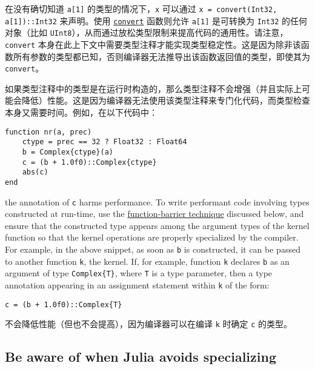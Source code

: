 在没有确切知道 \texttt{a[1]} 的类型的情况下，\texttt{x} 可以通过 \texttt{x = convert(Int32, a[1])::Int32} 来声明。使用 \hyperlink{1846942650946171605}{\texttt{convert}} 函数则允许 \texttt{a[1]} 是可转换为 \texttt{Int32} 的任何对象（比如 \texttt{UInt8}），从而通过放松类型限制来提高代码的通用性。请注意，\texttt{convert} 本身在此上下文中需要类型注释才能实现类型稳定性。这是因为除非该函数所有参数的类型都已知，否则编译器无法推导出该函数返回值的类型，即使其为 \texttt{convert}。



如果类型注释中的类型是在运行时构造的，那么类型注释不会增强（并且实际上可能会降低）性能。这是因为编译器无法使用该类型注释来专门化代码，而类型检查本身又需要时间。例如，在以下代码中：




\begin{verbatim}
function nr(a, prec)
    ctype = prec == 32 ? Float32 : Float64
    b = Complex{ctype}(a)
    c = (b + 1.0f0)::Complex{ctype}
    abs(c)
end
\end{verbatim}



the annotation of \texttt{c} harms performance. To write performant code involving types constructed at run-time, use the \hyperlink{17509985600836810807}{function-barrier technique} discussed below, and ensure that the constructed type appears among the argument types of the kernel function so that the kernel operations are properly specialized by the compiler. For example, in the above snippet, as soon as \texttt{b} is constructed, it can be passed to another function \texttt{k}, the kernel. If, for example, function \texttt{k} declares \texttt{b} as an argument of type \texttt{Complex\{T\}}, where \texttt{T} is a type parameter, then a type annotation appearing in an assignment statement within \texttt{k} of the form:




\begin{verbatim}
c = (b + 1.0f0)::Complex{T}
\end{verbatim}



不会降低性能（但也不会提高），因为编译器可以在编译 \texttt{k} 时确定 \texttt{c} 的类型。



\hypertarget{13987935381679254535}{}


\subsection{Be aware of when Julia avoids specializing}



